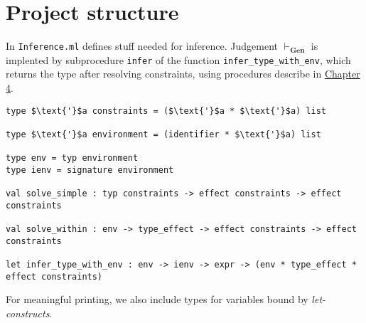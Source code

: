 \documentclass[declaration,shortabstract]{iithesis}
\theoremstyle{definition} \newtheorem{definition}{Definition}[section]
\begin{document}
\section{Project structure}
In \texttt{Inference.ml} defines stuff needed for inference.
Judgement $\vdash_\textbf{Gen}$ is implented by subprocedure \texttt{infer}
of the function \texttt{infer\_type\_with\_env}, which returns the type
after resolving constraints, using procedures describe in \hyperlink{section.4.2}{Chapter 4}.
\begin{lstlisting}
type $\text{'}$a constraints = ($\text{'}$a * $\text{'}$a) list

type $\text{'}$a environment = (identifier * $\text{'}$a) list

type env = typ environment
type ienv = signature environment

val solve_simple : typ constraints -> effect constraints -> effect constraints

val solve_within : env -> type_effect -> effect constraints -> effect constraints

let infer_type_with_env : env -> ienv -> expr -> (env * type_effect * effect constraints)
\end{lstlisting}
For meaningful printing, we also include types for variables bound by \textit{let-constructs}.

\end{document}
